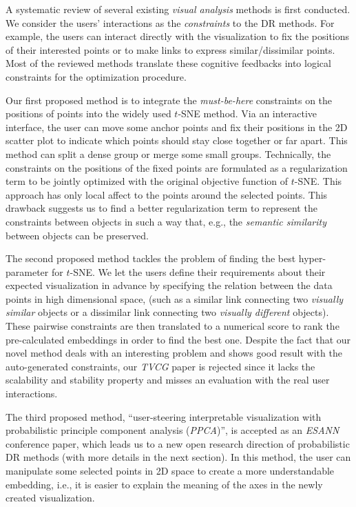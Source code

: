\documentclass[11pt, a4paper]{article}
\begin{document}
A systematic review of several existing \emph{visual analysis} methods is first conducted.
We consider the users' interactions as the \emph{constraints} to the DR methods.
For example, the users can interact directly with the visualization to fix the positions of their interested points or to make links to express similar/dissimilar points.
Most of the reviewed methods translate these cognitive feedbacks into logical constraints for the optimization procedure.

Our first proposed method is to integrate the \emph{must-be-here} constraints on the positions of points into the widely used $t$-SNE method.
Via an interactive interface, the user can move some anchor points and fix their positions in the 2D scatter plot to indicate which points should stay close together or far apart.
This method can split a dense group or merge some small groups.
Technically, the constraints on the positions of the fixed points are formulated as a regularization term to be jointly optimized with the original objective function of $t$-SNE.
This approach has only local affect to the points around the selected points.
This drawback suggests us to find a better regularization term to represent the constraints between objects in such a way that, e.g., the \emph{semantic similarity} between objects can be preserved.

The second proposed method tackles the problem of finding the best hyper-parameter for $t$-SNE.
We let the users define their requirements about their expected visualization in advance by specifying the relation between the data points in high dimensional space, (such as a similar link connecting two \emph{visually similar} objects or a dissimilar link connecting two \emph{visually different} objects). These pairwise constraints are then translated to a numerical score to rank the pre-calculated embeddings in order to find the best one.
Despite the fact that our novel method deals with an interesting problem and shows good result with the auto-generated constraints, our \emph{TVCG} paper is rejected since it lacks the scalability and stability property and misses an evaluation with the real user interactions.

The third proposed method, ``user-steering interpretable visualization with probabilistic principle component analysis (\emph{PPCA})'', is accepted as an \emph{ESANN} conference paper, which leads us to a new open research direction of probabilistic DR methods (with more details in the next section).
In this method, the user can manipulate some selected points in 2D space to create a more understandable embedding, i.e., it is easier to explain the meaning of the axes in the newly created visualization.
\end{document}
